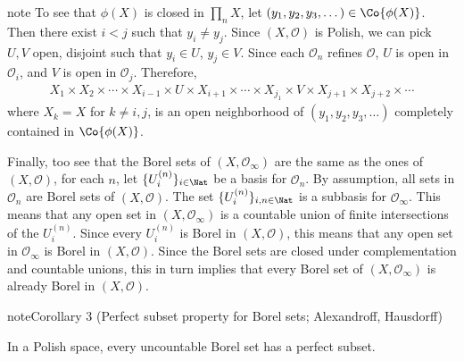 \documentclass[letterpaper,10pt,english]{jupyterBook}
\begin{document}
\begin{sphinxadmonition}{note}
\sphinxAtStartPar
To see that \(\phi(X)\) is closed in \(\prod_n X\), let \((y_1,y_2,y_3, \dots) \in \Co{\phi(X)}\). Then there exist \(i < j\) such that \(y_i \neq y_j\). Since \((X, \mathcal{O})\) is Polish, we can pick \(U,V\) open, disjoint such that \(y_i \in U\), \(y_j \in V\). Since each \(\mathcal{O}_n\) refines \(\mathcal{O}\), \(U\) is open in \(\mathcal{O}_i\), and \(V\) is open in \(\mathcal{O}_j\). Therefore,
\begin{equation*}
\begin{split}
    X_1 \times X_2 \times \cdots \times  X_{i-1} \times U \times X_{i+1} \times \cdots \times X_{j_1} \times V \times X_{j+1} \times X_{j+2} \times \cdots 
\end{split}
\end{equation*}
\sphinxAtStartPar
where \(X_k = X\) for \(k \neq i,j\), is an open neighborhood of \((y_1,y_2,y_3, \dots)\) completely contained in \(\Co{\phi(X)}\).

\sphinxAtStartPar
Finally, too see that the Borel sets of \((X, \mathcal{O}_\infty)\) are the same as the ones of \((X,\mathcal{O})\), for each \(n\), let \(\{U^{(n)}_i\}_{i \in \Nat}\) be a basis for \(\mathcal{O}_n\). By assumption, all sets in \(\mathcal{O}_n\) are Borel sets of \((X, \mathcal{O})\). The set \(\{U^{(n)}_i\}_{i,n \in \Nat}\) is a subbasis for \(\mathcal{O}_\infty\). This means that any open set in \((X, \mathcal{O}_\infty)\) is a countable union of finite intersections of the \(U^{(n)}_i\). Since every \(U^{(n)}_i\) is Borel in \((X, \mathcal{O})\), this means that any open set in \(\mathcal{O}_\infty\) is Borel in \((X, \mathcal{O})\). Since the Borel sets are closed under complementation and countable unions, this in turn implies that every Borel set of \((X, \mathcal{O}_\infty)\) is already Borel in \((X, \mathcal{O})\).
\end{sphinxadmonition}
\label{subsets_Polish:cor-perfect-Borel}
\begin{sphinxadmonition}{note}{Corollary 3 (Perfect subset property for Borel sets; Alexandroff, Hausdorff)}



\sphinxAtStartPar
In a Polish space, every uncountable Borel set has a perfect subset.
\end{sphinxadmonition}
\end{document}
